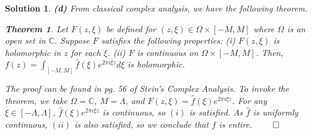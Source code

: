\documentclass{article} %
\theoremstyle{quest}
\newtheorem*{theorem}{Theorem}
\newtheorem*{solution}{Solution}
\begin{document}
\begin{solution}
\bigskip

\textbf{(d)} From classical complex analysis, we have the following theorem.

\begin{theorem}
Let $F(z,\xi)$ be defined for $(z,\xi) \in \Omega \times [-M,M]$ where $\Omega$ is an
open set in $\mathbb{C}$. Suppose $F$ satisfies the following properties: (i) 
$F(z,\xi)$ is holomorphic in $z$ for each $\xi$. (ii) $F$ is continuous on $\Omega \times [-M,M]$. 
Then, $f(z) = \int_{[-M,M]} \hat{f}(\xi) e^{2\pi i \xi z} d\xi$ is holomorphic.  
\end{theorem} 

The proof can be found in pg. 56 of Stein's Complex Analysis. To invoke the theorem, 
we take $\Omega = \mathbb{C}$,
$M = \Lambda$, and $F(z,\xi) = \hat{f}(\xi)e^{2\pi i \xi z}$. For any $\xi \in [-\Lambda, \Lambda]$,
$\hat{f}(\xi)e^{2\pi i \xi z}$ is continuous, so $(i)$ is satisfied. As $\hat{f}$ is uniformly continuous,
$(ii)$ is also satisfied, so we conclude that $f$ is entire. 
\hfill $\qed$

\end{solution}

\newpage
\end{document}
